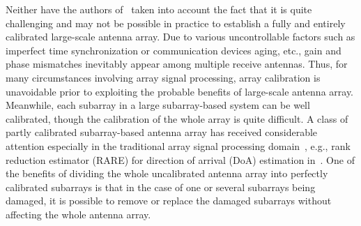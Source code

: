 \documentclass[12pt, draftclsnofoot, onecolumn]{IEEEtran}
\begin{document}
Neither have the authors of~\cite{W_Guo2017TVT} taken into account the fact that it is quite challenging and may not be possible in practice to establish a fully and entirely calibrated large-scale antenna array. Due to various uncontrollable factors such as imperfect time synchronization or communication devices aging, etc., gain and phase mismatches inevitably appear among multiple receive antennas. Thus, for many circumstances involving array signal processing, array calibration is unavoidable prior to exploiting the probable benefits of large-scale antenna array.
Meanwhile, each subarray in a large subarray-based system can be well calibrated, though the calibration of the whole array is quite difficult. A class of partly calibrated subarray-based antenna array has received considerable attention especially in the traditional array signal processing domain~\cite{F_Gao2005SPL, M_Pesavento2002TSP, CMS_See2004TSP}, e.g., rank reduction estimator (RARE) for direction of arrival (DoA) estimation in~\cite{M_Pesavento2002TSP, CMS_See2004TSP}. One of the benefits of dividing the whole uncalibrated antenna array into perfectly calibrated subarrays is that in the case of one or several subarrays being damaged, it is possible to remove or replace the damaged subarrays without affecting the whole antenna array.
\end{document}
